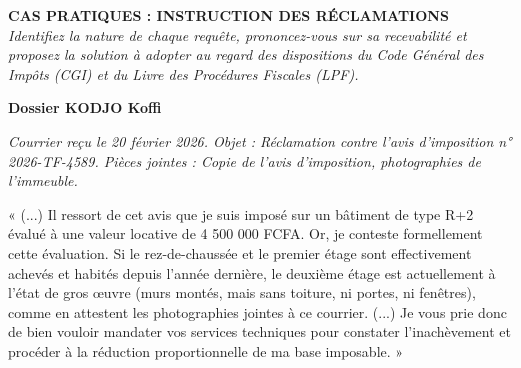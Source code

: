 \documentclass[a4paper, 11pt]{exam}
\begin{document}
	
	\begin{center}
		\Large \textbf{CAS PRATIQUES : INSTRUCTION DES RÉCLAMATIONS} \\[0.5cm]
		\normalsize \textit{Identifiez la nature de chaque requête, prononcez-vous sur sa recevabilité et proposez la solution à adopter au regard des dispositions du Code Général des Impôts (CGI) et du Livre des Procédures Fiscales (LPF).}
	\end{center}
	
	\vspace{0.5cm}
	
	\begin{questions}
		
		\question \textbf{Dossier KODJO Koffi}
		
		\textit{Courrier reçu le 20 février 2026. Objet : Réclamation contre l'avis d'imposition n° 2026-TF-4589. Pièces jointes : Copie de l'avis d'imposition, photographies de l'immeuble.}
		
		« (...) Il ressort de cet avis que je suis imposé sur un bâtiment de type R+2 évalué à une valeur locative de 4 500 000 FCFA. Or, je conteste formellement cette évaluation. Si le rez-de-chaussée et le premier étage sont effectivement achevés et habités depuis l'année dernière, le deuxième étage est actuellement à l'état de gros œuvre (murs montés, mais sans toiture, ni portes, ni fenêtres), comme en attestent les photographies jointes à ce courrier. (...) Je vous prie donc de bien vouloir mandater vos services techniques pour constater l'inachèvement et procéder à la réduction proportionnelle de ma base imposable. »
		
		

\end{questions}
\end{document}
